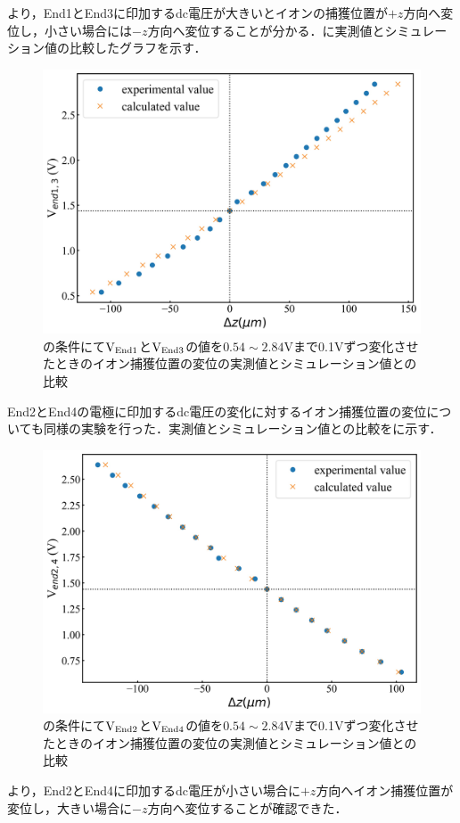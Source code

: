 より，End1とEnd3に印加するdc電圧が大きいとイオンの捕獲位置が$+z$方向へ変位し，小さい場合には$-z$方向へ変位することが分かる．に実測値とシミュレーション値の比較したグラフを示す．

\begin{figure}[h]
	\begin{center}
		\includegraphics[width = 0.7\linewidth]{./results/figure/out_V13.jpg}
		\caption{の条件にて${\rm V}_{\rm End1}$と${\rm V}_{\rm End3}$の値を$0.54 \sim 2.84$Vまで0.1Vずつ変化させたときのイオン捕獲位置の変位の実測値とシミュレーション値との比較}
		\label{fig:sim_exp_displacement_End13}
	\end{center}
\end{figure}

End2とEnd4の電極に印加するdc電圧の変化に対するイオン捕獲位置の変位についても同様の実験を行った．実測値とシミュレーション値との比較をに示す．

\begin{figure}[h]
	\begin{center}
		\includegraphics[width = 0.7\linewidth]{./results/figure/out_V24.jpg}
		\caption{の条件にて${\rm V}_{\rm End2}$と${\rm V}_{\rm End4}$の値を$0.54 \sim 2.84$Vまで0.1Vずつ変化させたときのイオン捕獲位置の変位の実測値とシミュレーション値との比較}
			\label{fig:sim_exp_displacement_End24}
	\end{center}
\end{figure}
より，End2とEnd4に印加するdc電圧が小さい場合に$+z$方向へイオン捕獲位置が変位し，大きい場合に$-z$方向へ変位することが確認できた．
